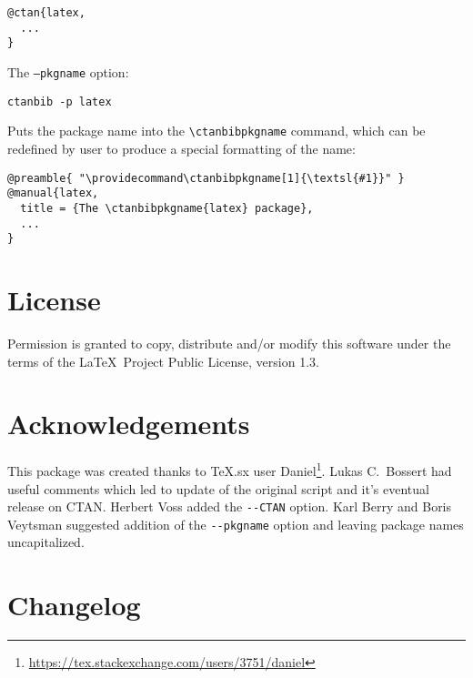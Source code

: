 \documentclass[11pt]{ltxdoc}
\begin{document}
\begin{verbatim}
@ctan{latex,
  ...
}
\end{verbatim}

\noindent The \texttt{--pkgname} option:

\begin{verbatim}
ctanbib -p latex
\end{verbatim}

\noindent Puts the package name into the \verb|\ctanbibpkgname| command, which can be
redefined by user to produce a special formatting of the name:

\begin{verbatim}
@preamble{ "\providecommand\ctanbibpkgname[1]{\textsl{#1}}" }
@manual{latex,
  title = {The \ctanbibpkgname{latex} package},
  ...
}
\end{verbatim}


\section{License}

Permission is granted to copy, distribute and/or modify this software
under the terms of the \LaTeX\ Project Public License, version 1.3.

\section{Acknowledgements}

This package was created thanks to TeX.sx user
Daniel\footnote{\url{https://tex.stackexchange.com/users/3751/daniel}}. Lukas
C.~Bossert had useful comments which led to update of the original script and
it's eventual release on CTAN. Herbert Voss added the \verb|--CTAN| option.
Karl Berry and Boris Veytsman suggested addition of the \verb|--pkgname| option 
and leaving package names uncapitalized.

\newpage
\section{Changelog}
\end{document}
